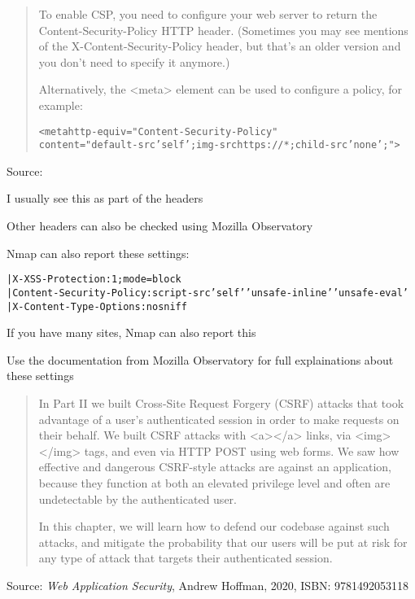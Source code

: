 \documentclass[Screen16to9,17pt]{foils}
\begin{document}


\begin{quote}
To enable CSP, you need to configure your web server to return the Content-Security-Policy HTTP header. (Sometimes you may see mentions of the X-Content-Security-Policy header, but that's an older version and you don't need to specify it anymore.)

Alternatively, the <meta> element can be used to configure a policy, for example:

\begin{alltt}
<meta http-equiv="Content-Security-Policy"
      content="default-src 'self'; img-src https://*; child-src 'none';">
\end{alltt}
\end{quote}
Source: 

\begin{list2}
\item I usually see this as part of the headers
\item Other headers can also be checked using Mozilla Observatory
\end{list2}



Nmap can also report these settings:
\begin{alltt}
|     X-XSS-Protection: 1;mode=block
|     Content-Security-Policy: script-src 'self' 'unsafe-inline' 'unsafe-eval'
|     X-Content-Type-Options: nosniff
\end{alltt}

\begin{list2}
\item If you have many sites, Nmap can also report this
\item Use the documentation from Mozilla Observatory for full explainations about these settings
\end{list2}








\begin{quote}
In Part II we built Cross-Site Request Forgery (CSRF) attacks that took advantage of a user’s authenticated session in order to make requests on their behalf. We built CSRF
attacks with <a></a> links, via <img></img> tags, and even via HTTP POST using
web forms. We saw how effective and dangerous CSRF-style attacks are against an application, because they function at both an elevated privilege level and often are undetectable by the authenticated user.

In this chapter, we will learn how to defend our codebase against such attacks, and mitigate the probability that our users will be put at risk for any type of attack that targets their authenticated session.
\end{quote}
Source: \emph{Web Application Security}, Andrew Hoffman, 2020, ISBN: 9781492053118
\end{document}
